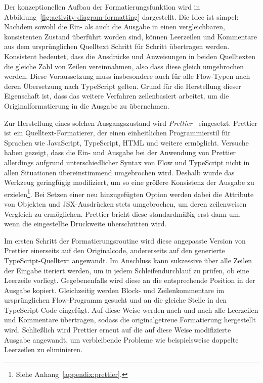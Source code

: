 Der konzeptionellen Aufbau der Formatierungsfunktion wird in Abbildung~\ref{fig:activity-diagram-formatting} dargestellt. Die Idee ist simpel: Nachdem sowohl die Ein- als auch die Ausgabe in einen vergleichbaren, konsistenten Zustand überführt worden sind, können Leerzeilen und Kommentare aus dem ursprünglichen Quelltext Schritt für Schritt übertragen werden. Konsistent bedeutet, dass die Ausdrücke und Anweisungen in beiden Quelltexten die gleiche Zahl von Zeilen vereinnahmen, also dass diese gleich umgebrochen werden. Diese Voraussetzung muss insbesondere auch für alle Flow-Typen nach deren Übersetzung nach TypeScript gelten. Grund für die Herstellung dieser Eigenschaft ist, dass das weitere Verfahren zeilenbasiert arbeitet, um die Originalformatierung in die Ausgabe zu übernehmen.

Zur Herstellung eines solchen Ausgangszustand wird \textit{Prettier}~\autocite{SOFTWARE:PRETTIER} eingesetzt. Prettier ist ein Quelltext-Formatierer, der einen einheitlichen Programmierstil für Sprachen wie JavaScript, TypeScript, HTML und weitere ermöglicht. Versuche haben gezeigt, dass die Ein- und Ausgabe bei der Anwendung von Prettier allerdings aufgrund unterschiedlicher Syntax von Flow und TypeScript nicht in allen Situationen übereinstimmend umgebrochen wird. Deshalb wurde das Werkzeug geringfügig modifiziert, um so eine größere Konsistenz der Ausgabe zu erzielen\footnote{Siehe Anhang~\ref{appendix:prettier}.}. Bei Setzen einer neu hinzugefügten Option werden dabei die Attribute von Objekten und JSX-Ausdrücken stets umgebrochen, um deren zeilenweisen Vergleich zu ermöglichen. Prettier bricht diese standardmäßig erst dann um, wenn die eingestellte Druckweite überschritten wird.

Im ersten Schritt der Formatierungsroutine wird diese angepasste Version von Prettier einerseits auf den Originalcode, andererseits auf den generierte TypeScript-Quelltext angewandt. Im Anschluss kann sukzessive über alle Zeilen der Eingabe iteriert werden, um in jedem Schleifendurchlauf zu prüfen, ob eine Leerzeile vorliegt. Gegebenenfalls wird diese an die entsprechende Position in der Ausgabe kopiert. Gleichzeitig werden Block- und Zeilenkommentare im ursprünglichen Flow-Programm gesucht und an die gleiche Stelle in den TypeScript-Code eingefügt. Auf diese Weise werden nach und nach alle Leerzeilen und Kommentare übertragen, sodass die originalgetreue Formatierung hergestellt wird. Schließlich wird Prettier erneut auf die auf diese Weise modifizierte Ausgabe angewandt, um verbleibende Probleme wie beispielsweise doppelte Leerzeilen zu eliminieren.
